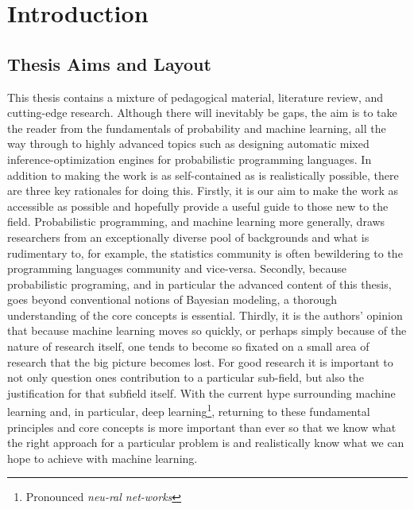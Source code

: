 
\chapter{Introduction}
\label{chp:intro}



\section{Thesis Aims and Layout}

This thesis contains a mixture of pedagogical material, literature review, and 
cutting-edge research.
Although there will inevitably be gaps, the aim is to take
the reader from the fundamentals of probability and machine learning,
all the way through to highly advanced topics such as designing automatic
mixed inference-optimization engines for probabilistic programming languages.
In addition to making the work is as self-contained as is realistically possible, there are
three key rationales for doing this.  Firstly, it is our aim to make the work 
as accessible as possible and hopefully provide a useful guide to those new to the field.
Probabilistic programming, and machine learning more generally, draws
researchers from an exceptionally diverse pool of backgrounds and what is rudimentary
to, for example, the statistics community is often bewildering to the programming
languages community and vice-versa. Secondly, because probabilistic programing, and 
in particular the advanced content of this thesis, goes beyond conventional notions of
Bayesian modeling, a thorough understanding of the core concepts is essential.
Thirdly, it is the authors' 
opinion that because machine learning moves so quickly, or perhaps simply because
of the nature of research itself, one tends to become so fixated on a small area of
research that the big picture becomes lost.  For good research it is important to not
only question ones contribution to a particular sub-field, but also the justification for
that subfield itself.  With the current hype surrounding machine learning and, in particular,
deep learning\footnote{Pronounced \emph{neu-ral net-works}}, returning to these
fundamental principles and core concepts is more important than ever so that we know 
what the right approach for a particular problem is and realistically know what we can
hope to achieve with machine learning.

